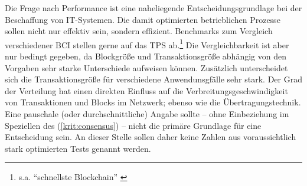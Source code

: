 Die Frage nach Performance ist eine naheliegende Entscheidungsgrundlage bei der Beschaffung von IT-Systemen.
Die damit optimierten betrieblichen Prozesse sollen nicht nur effektiv sein, sondern effizient.
Benchmarks zum Vergleich verschiedener \gls{BCI} stellen gerne auf das \gls{TPS} ab.\footnote{s.a. \enquote{schnellste Blockchain} \autocite{w:rbbc}}
Die Vergleichbarkeit ist aber nur bedingt gegeben, da Blockgröße und Transaktionsgröße abhängig von den Vorgaben sehr starke Unterschiede aufweisen können.
Zusätzlich unterscheidet sich die Transaktionsgröße für verschiedene Anwendunsgfälle sehr stark.
Der Grad der Verteilung hat einen direkten Einfluss auf die Verbreitungsgeschwindigkeit von Transaktionen und Blocks im Netzwerk; ebenso wie die Übertragungstechnik.
Eine pauschale (oder durchschnittliche) Angabe sollte -- ohne Einbeziehung im Speziellen des  (\ref{krit:consensus}) -- nicht die primäre Grundlage für eine Entscheidung sein. An dieser Stelle sollen daher keine Zahlen aus voraussichtlich stark optimierten Tests genannt werden.






